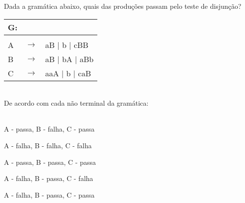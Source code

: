 \question[10] 

Dada a gramática abaixo, quais das produções passam pelo teste de disjunção?\\
\begin{tabular}{|l c l}
	G: & & \\
	\hline \\
	A & $\rightarrow$ & aB | b | cBB \\
    B & $\rightarrow$ & aB | bA | aBb \\
	C & $\rightarrow$ & aaA | b | caB \\
\end{tabular}
\\
De acordo com cada não terminal da gramática:\\
\\
\begin{choices}
\item A - passa, B - falha, C - passa %
\item A - falha, B - falha, C - falha
\item A - passa, B - passa, C - passa
\item A - falha, B - passa, C - falha
\item A - falha, B - passa, C - passa
\end{choices}
\answerline

